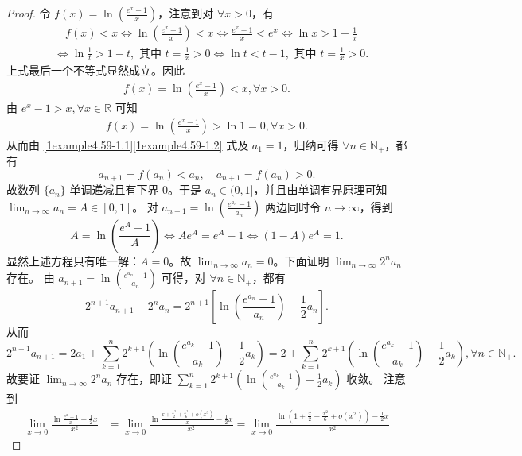 \documentclass[../../main.tex]{subfiles}
\begin{document}
\begin{proof}
令 \(f(x)=\ln\left(\frac{e^x - 1}{x}\right)\)，注意到对 \(\forall x > 0\)，有
\begin{align*}
& \quad f(x) < x \Leftrightarrow \ln\left(\frac{e^x - 1}{x}\right) < x \Leftrightarrow \frac{e^x - 1}{x} < e^x \Leftrightarrow \ln x > 1 - \frac{1}{x}\\
&\Leftrightarrow \ln\frac{1}{t} > 1 - t,\text{ 其中 }t = \frac{1}{x} > 0 \Leftrightarrow \ln t < t - 1,\text{ 其中 }t = \frac{1}{x} > 0.
\end{align*}
上式最后一个不等式显然成立。因此
\begin{align}
f(x)=\ln\left(\frac{e^x - 1}{x}\right) < x,\forall x > 0. \label{1example4.59-1.1}  
\end{align}
由 \(e^x - 1 > x,\forall x \in \mathbb{R}\) 可知
\begin{align}
f(x)=\ln\left(\frac{e^x - 1}{x}\right) > \ln 1 = 0,\forall x > 0. \label{1example4.59-1.2}
\end{align}
从而由 \eqref{1example4.59-1.1}\eqref{1example4.59-1.2} 式及 \(a_1 = 1\)，归纳可得 \(\forall n \in \mathbb{N}_+\)，都有
\[
a_{n + 1} = f(a_n) < a_n,\quad a_{n + 1} = f(a_n) > 0.
\]
故数列 \(\{ a_n \}\) 单调递减且有下界 \(0\)。于是 \(a_n \in (0, 1]\)，并且由单调有界原理可知 \(\lim_{n \to \infty} a_n = A \in [0, 1]\)。
对 \(a_{n + 1} = \ln\left(\frac{e^{a_n} - 1}{a_n}\right)\) 两边同时令 \(n \to \infty\)，得到
\[
A = \ln\left(\frac{e^A - 1}{A}\right) \Leftrightarrow Ae^A = e^A - 1 \Leftrightarrow (1 - A)e^A = 1.
\]
显然上述方程只有唯一解：\(A = 0\)。故 \(\lim_{n \to \infty} a_n = 0\)。下面证明 \(\lim_{n \to \infty} 2^n a_n\) 存在。
由 \(a_{n + 1} = \ln\left(\frac{e^{a_n} - 1}{a_n}\right)\) 可得，对 \(\forall n \in \mathbb{N}_+\)，都有
\[
2^{n + 1} a_{n + 1} - 2^n a_n = 2^{n + 1}\left[\ln\left(\frac{e^{a_n} - 1}{a_n}\right) - \frac{1}{2} a_n\right].
\]
从而
\[
2^{n + 1} a_{n + 1} = 2a_1 + \sum_{k = 1}^n 2^{k + 1}\left(\ln\left(\frac{e^{a_k} - 1}{a_k}\right) - \frac{1}{2} a_k\right) = 2 + \sum_{k = 1}^n 2^{k + 1}\left(\ln\left(\frac{e^{a_k} - 1}{a_k}\right) - \frac{1}{2} a_k\right),\forall n \in \mathbb{N}_+.
\]
故要证 \(\lim_{n \to \infty} 2^n a_n\) 存在，即证 \(\sum_{k = 1}^n 2^{k + 1}\left(\ln\left(\frac{e^{a_k} - 1}{a_k}\right) - \frac{1}{2} a_k\right)\) 收敛。
注意到
\begin{align*}
\lim_{x\rightarrow 0} \frac{\ln \frac{e^x-1}{x}-\frac{1}{2}x}{x^2}&=\lim_{x\rightarrow 0} \frac{\ln \frac{x+\frac{x^2}{2}+\frac{x^3}{6}+o(x^3)}{x}-\frac{1}{2}x}{x^2}=\lim_{x\rightarrow 0} \frac{\ln \left( 1+\frac{x}{2}+\frac{x^2}{6}+o(x^2) \right) -\frac{1}{2}x}{x^2}

\end{align*}
\end{proof}
\end{document}
